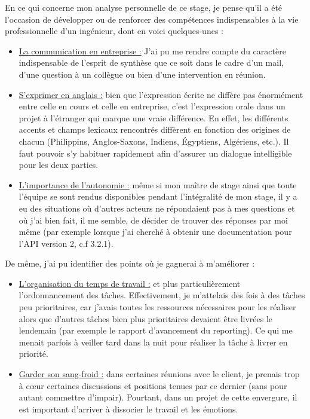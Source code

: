 En ce qui concerne mon analyse personnelle de ce stage, je pense qu'il a été l'occasion de développer ou de renforcer des compétences indispensables à la vie professionnelle d'un ingénieur, dont en voici quelques-unes :
\begin{itemize}
\item \underline{La communication en entreprise :} J'ai pu me rendre compte du caractère indispensable de l'esprit de synthèse que ce soit dans le cadre d'un mail, d'une question à un collègue ou bien d'une intervention en réunion.
\item \underline{S'exprimer en anglais :} bien que l'expression écrite ne diffère pas énormément entre celle en cours et celle en entreprise, c'est l'expression orale dans un projet à l'étranger qui marque une vraie différence. En effet, les différents accents et champs lexicaux rencontrés diffèrent en fonction des origines de chacun (Philippins, Anglos-Saxons, Indiens, Égyptiens, Algériens, etc.). Il faut pouvoir s'y habituer rapidement afin d'assurer un dialogue intelligible pour les deux parties.
\item \underline{L'importance de l'autonomie :} même si mon maître de stage ainsi que toute l'équipe se sont rendus disponibles pendant l'intégralité de mon stage, il y a eu des situations où d'autres acteurs ne répondaient pas à mes questions et où j'ai bien fait, il me semble, de décider de trouver des réponses par moi même (par exemple lorsque j'ai cherché à obtenir une documentation pour l'API version 2,  c.f 3.2.1).
\end{itemize}

De même, j'ai pu identifier des points où je gagnerai à m'améliorer :
\begin{itemize}
\item \underline{L'organisation du temps de travail :} et plus particulièrement l'ordonnancement des tâches. Effectivement, je m'attelais des fois à des tâches peu prioritaires, car j'avais toutes les ressources nécessaires pour les réaliser alors que d'autres tâches bien plus prioritaires devaient être livrées le lendemain (par exemple le rapport d'avancement du reporting). Ce qui me menait parfois à veiller tard dans la nuit pour réaliser la tâche à livrer en priorité.
\item \underline{Garder son sang-froid :} dans certaines réunions avec le client, je prenais trop à cœur certaines discussions et positions tenues par ce dernier (sans pour autant commettre d'impair). Pourtant, dans un projet de cette envergure, il est important d'arriver à dissocier le travail et les émotions.
\end{itemize}


